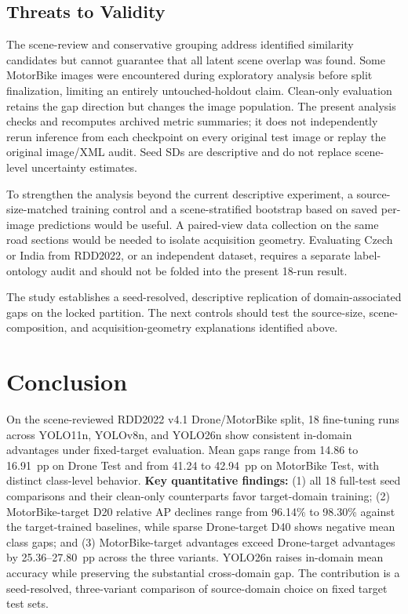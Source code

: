 \documentclass[conference,a4paper]{IEEEtran}
\begin{document}
\subsection{Threats to Validity}
The scene-review and conservative grouping address identified similarity candidates but cannot guarantee that all latent scene overlap was found. Some MotorBike images were encountered during exploratory analysis before split finalization, limiting an entirely untouched-holdout claim. Clean-only evaluation retains the gap direction but changes the image population. The present analysis checks and recomputes archived metric summaries; it does not independently rerun inference from each checkpoint on every original test image or replay the original image/XML audit. Seed SDs are descriptive and do not replace scene-level uncertainty estimates.

To strengthen the analysis beyond the current descriptive experiment, a source-size-matched training control and a scene-stratified bootstrap based on saved per-image predictions would be useful. A paired-view data collection on the same road sections would be needed to isolate acquisition geometry. Evaluating Czech or India from RDD2022, or an independent dataset, requires a separate label-ontology audit and should not be folded into the present 18-run result.

The study establishes a seed-resolved, descriptive replication of domain-associated gaps on the locked partition. The next controls should test the source-size, scene-composition, and acquisition-geometry explanations identified above.

\section{Conclusion}
On the scene-reviewed RDD2022 v4.1 Drone/MotorBike split, 18 fine-tuning runs across YOLO11n, YOLOv8n, and YOLO26n show consistent in-domain advantages under fixed-target evaluation. Mean gaps range from 14.86 to 16.91~pp on Drone Test and from 41.24 to 42.94~pp on MotorBike Test, with distinct class-level behavior. \textbf{Key quantitative findings:} (1) all 18 full-test seed comparisons and their clean-only counterparts favor target-domain training; (2) MotorBike-target D20 relative AP declines range from 96.14\% to 98.30\% against the target-trained baselines, while sparse Drone-target D40 shows negative mean class gaps; and (3) MotorBike-target advantages exceed Drone-target advantages by 25.36--27.80~pp across the three variants. YOLO26n raises in-domain mean accuracy while preserving the substantial cross-domain gap. The contribution is a seed-resolved, three-variant comparison of source-domain choice on fixed target test sets.
\end{document}
